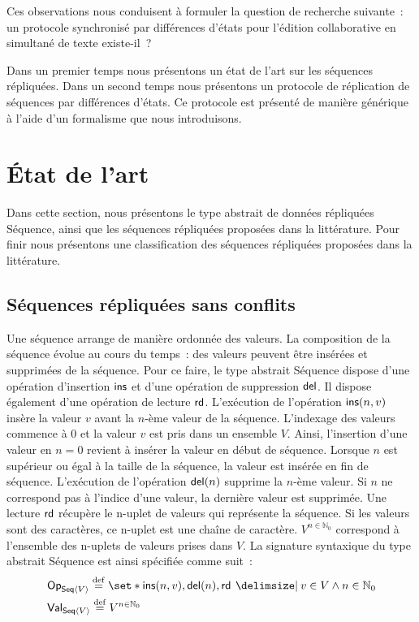 Ces observations nous conduisent à formuler la question de recherche suivante~: un protocole synchronisé par différences d'états pour l'édition collaborative en simultané de texte existe-il~?

Dans un premier temps nous présentons un état de l'art sur les séquences répliquées.
Dans un second temps nous présentons un protocole de réplication de séquences par différences d'états.
Ce protocole est présenté de manière générique à l'aide d'un formalisme que nous introduisons.


\section{État de l'art}\label{sec:state-art-seq}

Dans cette section, nous présentons le type abstrait de données répliquées Séquence, ainsi que les séquences répliquées proposées dans la littérature.
Pour finir nous présentons une classification des séquences répliquées proposées dans la littérature.

\subsection{Séquences répliquées sans conflits}\label{subsec:replseq}

Une séquence arrange de manière ordonnée des valeurs.
La composition de la séquence évolue au cours du temps~:
des valeurs peuvent être insérées et supprimées de la séquence.
Pour ce faire, le type abstrait Séquence dispose d'une opération d'insertion $\operatorname{\mathsf{ins}}$ et d'une opération de suppression $\operatorname{\mathsf{del}}$.
Il dispose également d'une opération de lecture $\operatorname{\mathsf{rd}}$.
L'exécution de l'opération $\operatorname{\mathsf{ins}}(n, v)$ insère la valeur $v$ avant la $n$-ème valeur de la séquence.
L'indexage des valeurs commence à $0$ et la valeur $v$ est pris dans un ensemble $V$.
Ainsi, l'insertion d'une valeur en $n = 0$ revient à insérer la valeur en début de séquence.
Lorsque $n$ est supérieur ou égal à la taille de la séquence, la valeur est insérée en fin de séquence.
L'exécution de l'opération $\operatorname{\mathsf{del}}(n)$ supprime la $n$-ème valeur.
Si $n$ ne correspond pas à l'indice d'une valeur, la dernière valeur est supprimée.
Une lecture $\operatorname{\mathsf{rd}}$ récupère le n-uplet de valeurs qui représente la séquence.
Si les valeurs sont des caractères, ce n-uplet est une chaîne de caractère.
$V^{n \in \mathbb{N}_0}$ correspond à l'ensemble des n-uplets de valeurs prises dans $V$.
La signature syntaxique du type abstrait Séquence est ainsi spécifiée comme suit~:
%
\begin{align*}
&\trm{Op}_{\trm{Seq}\tuple*{V}} \defeq \set*{\trm{ins}(n, v), \trm{del}(n), \trm{rd} \given v \in V \land n \in \mathbb{N}_0}\\
&\trm{Val}_{\trm{Seq}\tuple*{V}} \defeq V^{n \in \mathbb{N}_0}
\end{align*}

